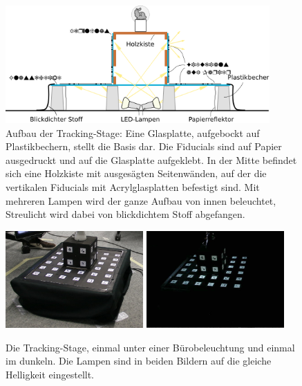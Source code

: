    \begin{figure}[h]
    \centering
    \includegraphics[width=0.9\textwidth]{../graphics/position/stage_drawing.svg}
    \caption[Aufbau der Tracking-Stage]{Aufbau der Tracking-Stage: Eine Glasplatte, aufgebockt auf Plastikbechern, stellt die Basis dar. Die Fiducials sind auf Papier ausgedruckt und auf die Glasplatte aufgeklebt.
     In der Mitte befindet sich eine Holzkiste mit ausgesägten Seitenwänden, auf der die vertikalen Fiducials mit Acrylglasplatten befestigt sind.
     Mit mehreren Lampen wird der ganze Aufbau von innen beleuchtet, Streulicht wird dabei von blickdichtem Stoff abgefangen.}
    \label{fig:stage_drawing}
   \end{figure}

  \begin{figure}[h]
    \centering
    \includegraphics[width=0.47\textwidth]{../graphics/position/stage_day.jpg}
    \includegraphics[width=0.47\textwidth]{../graphics/position/stage_night.jpg}
    \caption[Fotos der Tracking-Stage]{Die Tracking-Stage, einmal unter einer Bürobeleuchtung und einmal im dunkeln. Die Lampen sind in beiden Bildern auf die gleiche Helligkeit eingestellt.}
    \label{fig:stage_fotos}
   \end{figure}

